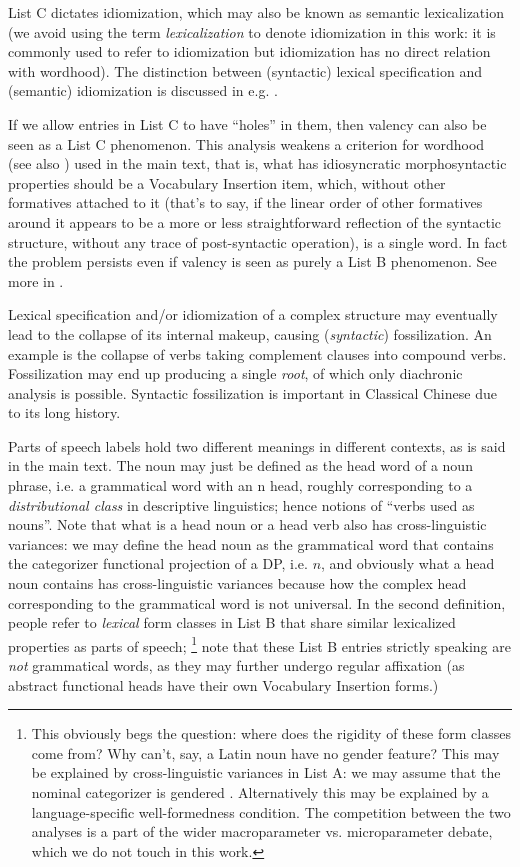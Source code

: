 \documentclass[UTF8, a4paper, oneside, scheme=plain, 12pt]{ctexrep}
\newcommand*{\term}[1]{\emph{#1}}
\begin{document}
{List C dictates idiomization, which may also be known as semantic lexicalization (we avoid using the term \term{lexicalization} to denote idiomization in this work: it is commonly used to refer to idiomization but idiomization has no direct relation with wordhood).
The distinction between (syntactic) lexical specification and (semantic) idiomization is discussed in e.g. \citet{mcinnerney2023argument}.

If we allow entries in List C to have ``holes'' in them, then valency can also be seen as a List C phenomenon.
This analysis weakens a criterion for wordhood (see also ) used in the main text, that is,
what has idiosyncratic morphosyntactic properties should be a Vocabulary Insertion item,
which, without other formatives attached to it (that's to say, if the linear order of other formatives around it appears to be a more or less straightforward reflection of the syntactic structure, without any trace of post-syntactic operation), is a single word. 
In fact the problem persists even if valency is seen as purely a List B phenomenon.
See more in .

Lexical specification and/or idiomization of a complex structure may eventually lead to the collapse of its internal makeup, causing (\emph{syntactic}) fossilization.
An example is the collapse of verbs taking complement clauses into compound verbs.
Fossilization may end up producing a single \emph{root},
of which only diachronic analysis is possible.
Syntactic fossilization is important in Classical Chinese due to its long history.

Parts of speech labels hold two different meanings in different contexts, as is said in the main text.
The noun may just be defined as the head word of a noun phrase, i.e. a grammatical word with an n head, roughly corresponding to a \emph{distributional class} in descriptive linguistics; 
hence notions of ``verbs used as nouns''.
Note that what is a head noun or a head verb also has cross-linguistic variances:
we may define the head noun as the grammatical word that contains the categorizer functional projection of a DP, i.e. $n$, and obviously what a head noun contains has cross-linguistic variances because how the complex head corresponding to the grammatical word is not universal.
In the second definition, people refer to \emph{lexical} form classes in List B that share similar lexicalized properties as parts of speech;%
\footnote{
    This obviously begs the question: where does the rigidity of these form classes come from?
    Why can't, say, a Latin noun have no gender feature?
    This may be explained by cross-linguistic variances in List A:
    we may assume that the nominal categorizer is gendered \citep{kramer2015gender}.
    Alternatively this may be explained by a language-specific well-formedness condition.
    The competition between the two analyses is a part of the wider macroparameter vs. microparameter debate, which we do not touch in this work.
}
note that these List B entries strictly speaking are \emph{not} grammatical words, as they may further undergo regular affixation (as abstract functional heads have their own Vocabulary Insertion forms.)

}
\end{document}
